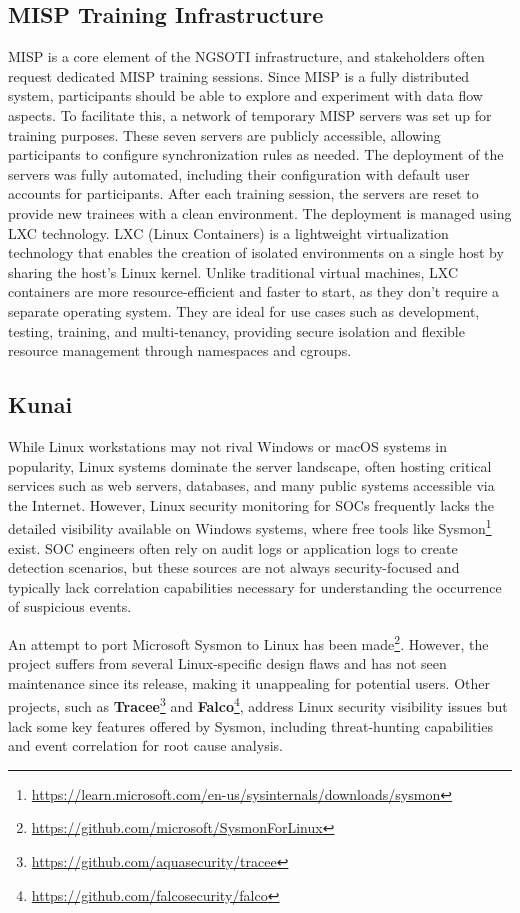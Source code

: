 \subsection{MISP Training Infrastructure}
MISP is a core element of the NGSOTI infrastructure, and stakeholders often request dedicated MISP training sessions. Since MISP is a fully distributed system, participants should be able to explore and experiment with data flow aspects. To facilitate this, a network of temporary MISP servers was set up for training purposes. These seven servers are publicly accessible, allowing participants to configure synchronization rules as needed. The deployment of the servers was fully automated, including their configuration with default user accounts for participants. After each training session, the servers are reset to provide new trainees with a clean environment. The deployment is managed using LXC technology. LXC (Linux Containers) is a lightweight virtualization technology that enables the creation of isolated environments on a single host by sharing the host's Linux kernel. Unlike traditional virtual machines, LXC containers are more resource-efficient and faster to start, as they don't require a separate operating system. They are ideal for use cases such as development, testing, training, and multi-tenancy, providing secure isolation and flexible resource management through namespaces and cgroups.


\subsection{Kunai}

While Linux workstations may not rival Windows or macOS systems in popularity, Linux systems dominate the server landscape, often hosting critical services such as web servers, databases, and many public systems accessible via the Internet. However, Linux security monitoring for SOCs frequently lacks the detailed visibility available on Windows systems, where free tools like Sysmon\footnote{\href{https://learn.microsoft.com/en-us/sysinternals/downloads/sysmon}{https://learn.microsoft.com/en-us/sysinternals/downloads/sysmon}} exist. SOC engineers often rely on audit logs or application logs to create detection scenarios, but these sources are not always security-focused and typically lack correlation capabilities necessary for understanding the occurrence of suspicious events.

An attempt to port Microsoft Sysmon to Linux has been made\footnote{\href{https://github.com/microsoft/SysmonForLinux}{https://github.com/microsoft/SysmonForLinux}}. However, the project suffers from several Linux-specific design flaws and has not seen maintenance since its release, making it unappealing for potential users. Other projects, such as \textbf{Tracee}\footnote{\href{https://github.com/aquasecurity/tracee}{https://github.com/aquasecurity/tracee}} and \textbf{Falco}\footnote{\href{https://github.com/falcosecurity/falco}{https://github.com/falcosecurity/falco}}, address Linux security visibility issues but lack some key features offered by Sysmon, including threat-hunting capabilities and event correlation for root cause analysis.

